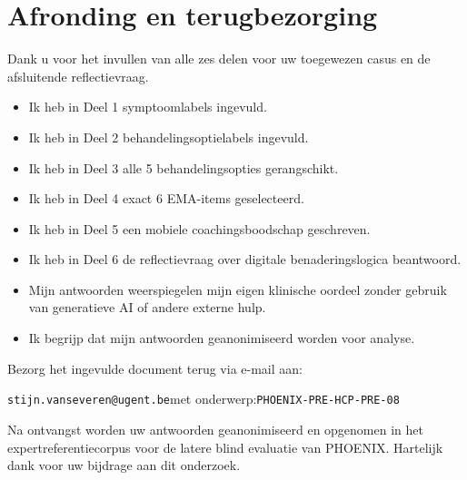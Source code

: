 \documentclass[11pt,a4paper]{article}
\begin{document}
\section{Afronding en terugbezorging}

Dank u voor het invullen van alle zes delen voor uw toegewezen casus
en de afsluitende reflectievraag.

\begin{instrbox}[title=Checklist voor terugbezorging]
\begin{itemize}
\item[$\square$] Ik heb in Deel 1 symptoomlabels ingevuld.
\item[$\square$] Ik heb in Deel 2 behandelingsoptielabels ingevuld.
\item[$\square$] Ik heb in Deel 3 alle 5 behandelingsopties gerangschikt.
\item[$\square$] Ik heb in Deel 4 exact 6 EMA-items geselecteerd.
\item[$\square$] Ik heb in Deel 5 een mobiele coachingsboodschap geschreven.
\item[$\square$] Ik heb in Deel 6 de reflectievraag over digitale benaderingslogica beantwoord.
\item[$\square$] Mijn antwoorden weerspiegelen mijn eigen klinische oordeel zonder gebruik van generatieve AI of andere externe hulp.
\item[$\square$] Ik begrijp dat mijn antwoorden geanonimiseerd worden voor analyse.
\end{itemize}
\end{instrbox}

\medskip
Bezorg het ingevulde document terug via e-mail aan:
\begin{center}
\texttt{stijn.vanseveren@ugent.be}\quad met onderwerp:\quad \texttt{PHOENIX-PRE-HCP-PRE-08}
\end{center}

\vspace{0.5em}
\begin{tcolorbox}[colback=AccentBlue,colframe=PrimaryBlue,arc=2mm,boxrule=0.6pt,left=8pt,right=8pt,top=7pt,bottom=7pt]
\small\centering
Na ontvangst worden uw antwoorden geanonimiseerd en opgenomen in het expertreferentiecorpus
voor de latere blind evaluatie van PHOENIX. Hartelijk dank voor uw bijdrage aan dit onderzoek.
\end{tcolorbox}
\end{document}
